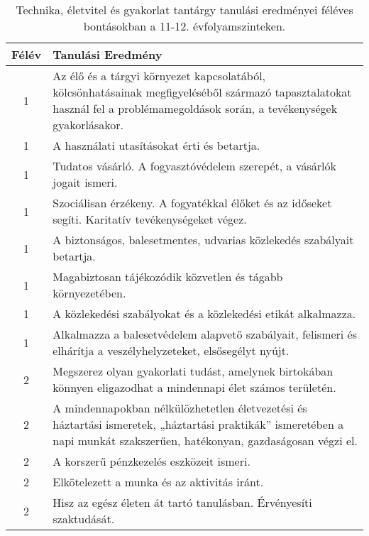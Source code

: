        
           \begin{longtable}{c | p{} }
            \caption[Technika, életvitel és gyakorlat 11-12.]{Technika, életvitel és gyakorlat tantárgy tanulási eredményei féléves bontásokban a 11-12. évfolyamszinteken. }  \\

            \textbf{Félév} & \textbf{Tanulási Eredmény} \\
            \hline
            \endhead
                                
                                          1 &  Az élő és a tárgyi környezet kapcsolatából, kölcsönhatásainak megfigyeléséből származó tapasztalatokat használ fel a problémamegoldások során, a tevékenységek gyakorlásakor. \\ \hline
                                          1 &  A használati utasításokat érti és betartja. \\ \hline
                                          1 &  Tudatos vásárló. A fogyasztóvédelem szerepét, a vásárlók jogait ismeri. \\ \hline
                                          1 &  Szociálisan érzékeny. A fogyatékkal élőket és az időseket segíti. Karitatív tevékenységeket végez. \\ \hline
                                          1 &  A biztonságos, balesetmentes, udvarias közlekedés szabályait betartja. \\ \hline
                                          1 &  Magabiztosan tájékozódik közvetlen és tágabb környezetében. \\ \hline
                                          1 &  A közlekedési szabályokat és a közlekedési etikát alkalmazza. \\ \hline
                                          1 &  Alkalmazza a balesetvédelem alapvető szabályait, felismeri és elhárítja a veszélyhelyzeteket, elsősegélyt nyújt. \\ \hline
                                      
                                
                                          2 &  Megszerez olyan gyakorlati tudást, amelynek birtokában könnyen eligazodhat a mindennapi élet számos területén. \\ \hline
                                          2 &  A mindennapokban nélkülözhetetlen életvezetési és háztartási ismeretek, „háztartási praktikák” ismeretében a napi munkát szakszerűen, hatékonyan, gazdaságosan végzi el. \\ \hline
                                          2 &  A korszerű pénzkezelés eszközeit ismeri. \\ \hline
                                          2 &  Elkötelezett a munka és az aktivitás iránt. \\ \hline
                                          2 &  Hisz az egész életen át tartó tanulásban. Érvényesíti szaktudását. \\ \hline
                                      

\end{longtable}
